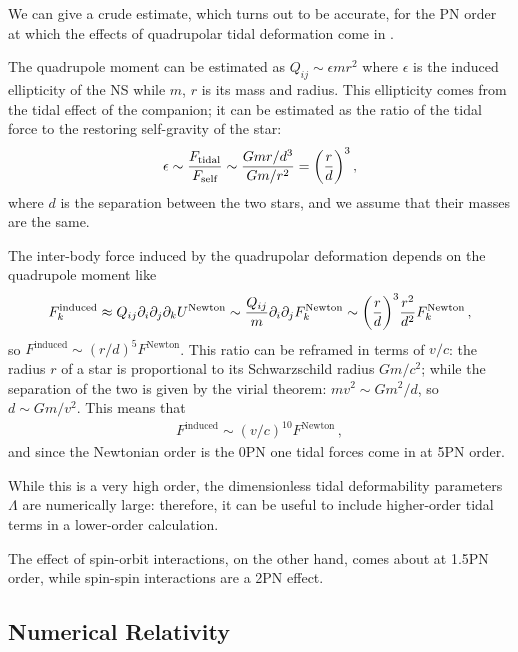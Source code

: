 \documentclass[main.tex]{subfiles}
\begin{document}
We can give a crude estimate, which turns out to be accurate, for the \ac{PN} order at which the effects of quadrupolar tidal deformation come in \cite[pagg.\ 288--289]{maggioreGravitationalWavesVolume2007}. 

The quadrupole moment can be estimated as \(Q_{ij} \sim \epsilon mr^2\) where \(\epsilon \) is the induced ellipticity of the \ac{NS} while \(m\), \(r\) is its mass and radius.
This ellipticity comes from the tidal effect of the companion; it can be estimated as the ratio of the tidal force to the restoring self-gravity of the star: 
%
\begin{align}
\epsilon \sim \frac{F _{\text{tidal}}}{ F _{\text{self}}} \sim \frac{Gm r / d^3}{Gm / r^2} = \qty( \frac{r}{d})^3
\,,
\end{align}
%
where \(d\) is the separation between the two stars, and we assume that their masses are the same. 

The inter-body force induced by the quadrupolar deformation depends on the quadrupole moment like \cite[eqs.\ 5.219, 5.235]{maggioreGravitationalWavesVolume2007}
%
\begin{align}
F ^{\text{induced}}_k \approx Q_{ij} \partial_{i} \partial_{j} \partial_{k} U^{\text{Newton}} \sim \frac{Q_{ij}}{m} \partial_{i} \partial_{j} F^{\text{Newton}}_k \sim \qty( \frac{r}{d})^3 \frac{r^2}{d^2} F^{\text{Newton}}_k
\,,
\end{align}
%
so \(F^{\text{induced}} \sim (r/d)^{5} F^{\text{Newton}}\). 
This ratio can be reframed in terms of \(v/c\): the radius \(r\) of a star is proportional to its Schwarzschild radius \(Gm/c^2\); while the separation of the two is given by the virial theorem: \(m v^2 \sim Gm^2 /d\), so \(d \sim Gm / v^2\). This means that 
%
\begin{align}
F^{\text{induced}} \sim (v/c)^{10} F^{\text{Newton}}
\,,
\end{align}
%
and since the Newtonian order is the 0PN one tidal forces come in at 5PN order. 

While this is a very high order, the dimensionless tidal deformability parameters \(\Lambda \) are numerically large: therefore, it can be useful to include higher-order tidal terms in a lower-order calculation. 

The effect of spin-orbit interactions, on the other hand, comes about at 1.5PN order, while spin-spin interactions are a 2PN effect.

\subsection{Numerical Relativity} \label{sec:nr}
\end{document}
